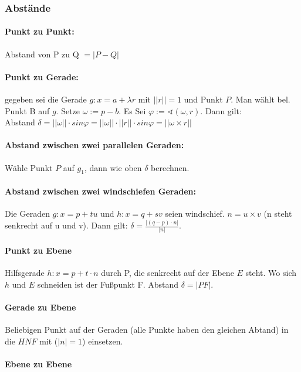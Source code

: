 \documentclass[a4paper, twocolumn]{article}
\begin{document}
       
   
   \subsubsection{Abstände}
      \paragraph{Punkt zu Punkt:}
      Abstand von P zu Q $= |P-Q|$
      
      \paragraph{Punkt zu Gerade:}
      gegeben sei die Gerade $g\colon x = a + \lambda r$ mit $||r|| = 1$ und Punkt $P$. 
      Man wählt bel. Punkt B auf $g$. Setze $\omega := p-b$. 
      Es Sei $\varphi := \sphericalangle(\omega, r)$. Dann gilt:\\
      Abstand $\delta = ||\omega|| \cdot sin \varphi = ||\omega|| \cdot ||r|| \cdot sin \varphi = ||\omega \times r||$
      
      \paragraph{Abstand zwischen zwei parallelen Geraden:}
      Wähle Punkt $P$ auf $g_1$, dann wie oben $\delta$ berechnen.

      \paragraph{Abstand zwischen zwei windschiefen Geraden:}
      Die Geraden $g: x = p +  tu$ und $h: x = q + sv$ seien windschief. $n = u \times v$ (n steht senkrecht auf u und v). Dann gilt: $\delta = \frac{|(q-p) \cdot n|}{|n|}$.

      \paragraph{Punkt zu Ebene}      
      Hilfsgerade $h: x = p + t \cdot n$ durch P, die senkrecht auf der Ebene $E$ steht. Wo sich $h$ und $E$ schneiden ist der Fußpunkt F. Abstand $\delta = |PF|$.

      \paragraph{Gerade zu Ebene}
      Beliebigen Punkt auf der Geraden (alle Punkte haben den gleichen Abtand) in die $HNF$ mit ($|n| = 1$) einsetzen.
      
      \paragraph{Ebene zu Ebene}
   
 
\end{document}
